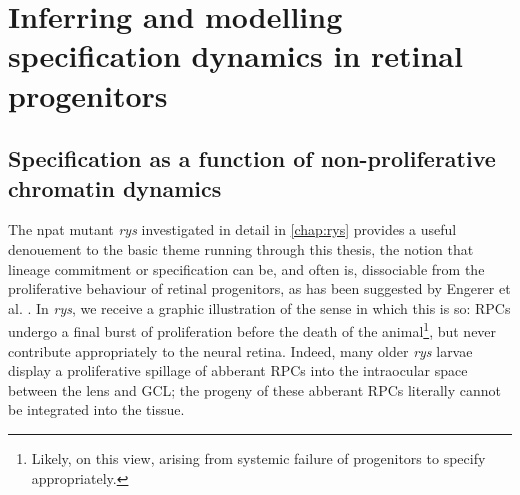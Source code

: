 \chapter{Inferring and modelling specification dynamics in retinal progenitors}
\label{chap:rysoutro}

\section{Specification as a function of non-proliferative chromatin dynamics}
The npat mutant \textit{rys} investigated in detail in \autoref{chap:rys} provides a useful denouement to the basic theme running through this thesis, the notion that lineage commitment or specification can be, and often is, dissociable from the proliferative behaviour of retinal progenitors, as has been suggested by Engerer et al. \cite{Engerer2017}. In \textit{rys}, we receive a graphic illustration of the sense in which this is so: RPCs undergo a final burst of proliferation before the death of the animal\footnote{Likely, on this view, arising from systemic failure of progenitors to specify appropriately.}, but never contribute appropriately to the neural retina. Indeed, many older \textit{rys} larvae display a proliferative spillage of abberant RPCs into the intraocular space between the lens and GCL; the progeny of these abberant RPCs literally cannot be integrated into the tissue.

